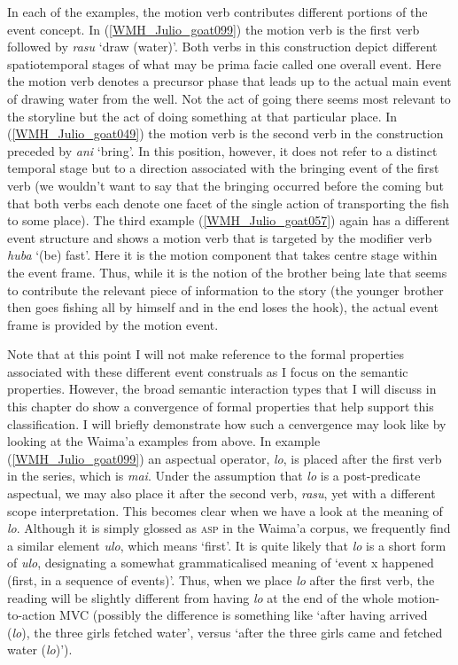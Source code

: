 In each of the examples, the motion verb contributes different portions of the event concept. In (\ref{WMH_Julio_goat099}) the motion verb is the first verb followed by \textit{rasu} `draw (water)'. Both verbs in this construction depict different spatiotemporal stages of what may be prima facie called one overall event. Here the motion verb denotes a precursor phase that leads up to the actual main event of drawing water from the well. Not the act of going there seems most relevant to the storyline but the act of doing something at that particular place. In (\ref{WMH_Julio_goat049}) the motion verb is the second verb in the construction preceded by \textit{ani} `bring'. In this position, however, it does not refer to a distinct temporal stage but to a direction associated with the bringing event of the first verb (we wouldn't want to say that the bringing occurred before the coming but that both verbs each denote one facet of the single action of transporting the fish to some place). The third example (\ref{WMH_Julio_goat057}) again has a different event structure and shows a motion verb that is targeted by the modifier verb \textit{huba} `(be) fast'. Here it is the motion component that takes centre stage within the event frame. Thus, while it is the notion of the brother being late that seems to contribute the relevant piece of information to the story (the younger brother then goes fishing all by himself and in the end loses the hook), the actual event frame is provided by the motion event.

Note that at this point I will not make reference to the formal properties associated with these different event construals as I focus on the semantic properties. However, the broad semantic interaction types that I will discuss in this chapter do show a convergence of formal properties that help support this classification. I will briefly demonstrate how such a cenvergence may look like by looking at the Waima'a examples from above. In example (\ref{WMH_Julio_goat099}) an aspectual operator, \textit{lo}, is placed after the first verb in the series, which is \textit{mai}. Under the assumption that \textit{lo} is a post-predicate aspectual, we may also place it after the second verb, \textit{rasu}, yet with a different scope interpretation. This becomes clear when we have a look at the meaning of \textit{lo}. Although it is simply glossed as \textsc{asp} in the Waima'a corpus, we frequently find a similar element \textit{ulo}, which means `first'. It is quite likely that \textit{lo} is a short form of \textit{ulo}, designating a somewhat grammaticalised meaning of `event x happened (first, in a sequence of events)'. Thus, when we place \textit{lo} after the first verb, the reading will be slightly different from having \textit{lo} at the end of the whole motion-to-action MVC (possibly the difference is something like `after having arrived (\textit{lo}), the three girls fetched water', versus `after the three girls came and fetched water (\textit{lo})').

